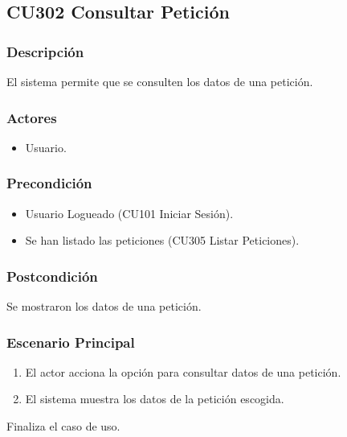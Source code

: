 \subsection{CU302 Consultar Petici\'{o}n}
\subsubsection{Descripci\'{o}n}
El sistema permite que se consulten los datos de una petici\'{o}n.
\subsubsection{Actores}
\begin{itemize}
\item Usuario.
\end{itemize}
\subsubsection{Precondici\'{o}n}
\begin{itemize}
\item Usuario Logueado (CU101 Iniciar Sesi\'{o}n).
\item Se han listado las peticiones (CU305 Listar Peticiones).
\end{itemize}
\subsubsection{Postcondici\'{o}n}
Se mostraron los datos de una petici\'{o}n.
\subsubsection{Escenario Principal}
\begin{enumerate}
\item El actor acciona la opci\'{o}n para consultar datos de una petici\'{o}n.
\item El sistema muestra los datos de la petici\'{o}n escogida.
\end{enumerate}
Finaliza el caso de uso.